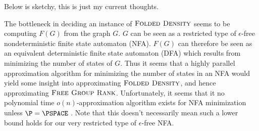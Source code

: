 \documentclass{article}
\newcommand{\FGR}{\textsc{Free Group Rank}}
\newcommand{\FD}{\textsc{Folded Density}}
\begin{document}
\begin{todo}
  Below is sketchy, this is just my current thoughts.
\end{todo}
The bottleneck in deciding an instance of $\FD$ seems to be computing $F(G)$ from the graph $G$.
$G$ can be seen as a restricted type of $\epsilon$-free nondeterministic finite state automaton (NFA).
$F(G)$ can therefore be seen as an equivalent deterministic finite state automaton (DFA) which results from minimizing the number of states of $G$.
Thus it seems that a highly parallel approximation algorithm for minimizing the number of states in an NFA would yield some insight into approximating $\FD$, and hence approximating $\FGR$.
Unfortunately, it seems that it no polynomial time $o(n)$-approximation algorithm exists for NFA minimization unless $\P = \PSPACE$ \cite[Theorem~4]{gs05}.
Note that this doesn't necessarily mean such a lower bound holds for our very restricted type of $\epsilon$-free NFA.



\end{document}

